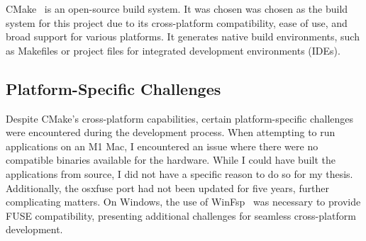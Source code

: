 CMake~\cite{cmake} is an open-source build system.
It was chosen was chosen as the build system for this project due to its cross-platform compatibility, ease of use, and broad support for various platforms.
It generates native build environments, such as Makefiles or project files for integrated development environments (IDEs).

\subsection{Platform-Specific Challenges}\label{subsec:platform-specific-challenges}

Despite CMake's cross-platform capabilities, certain platform-specific challenges were encountered during the development process.
When attempting to run applications on an M1 Mac, I encountered an issue where there were no compatible binaries available for the hardware.
While I could have built the applications from source, I did not have a specific reason to do so for my thesis.
Additionally, the osxfuse port had not been updated for five years, further complicating matters.
On Windows, the use of WinFsp~\cite{winfsp} was necessary to provide FUSE compatibility, presenting additional challenges for seamless cross-platform development.